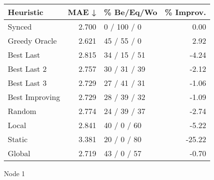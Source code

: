 \begin{tabular}{lrlr}
\toprule
\textbf{Heuristic} & \textbf{MAE ↓} & \textbf{\% Be/Eq/Wo} & \textbf{\% Improv.} \\
\midrule
            Synced &          2.700 &          0 / 100 / 0 &                0.00 \\
     Greedy Oracle &          2.621 &          45 / 55 / 0 &                2.92 \\
         Best Last &          2.815 &         34 / 15 / 51 &               -4.24 \\
       Best Last 2 &          2.757 &         30 / 31 / 39 &               -2.12 \\
       Best Last 3 &          2.729 &         27 / 41 / 31 &               -1.06 \\
    Best Improving &          2.729 &         28 / 39 / 32 &               -1.09 \\
            Random &          2.774 &         24 / 39 / 37 &               -2.74 \\
             Local &          2.841 &          40 / 0 / 60 &               -5.22 \\
            Static &          3.381 &          20 / 0 / 80 &              -25.22 \\
            Global &          2.719 &          43 / 0 / 57 &               -0.70 \\
\bottomrule
\end{tabular}
\caption{Node 1}
\label{tab:hr_iid_lr05_le2_bs2_1}
